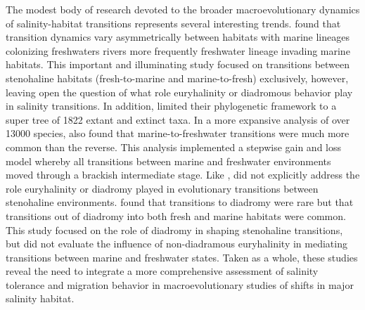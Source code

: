 \documentclass[11pt]{article}
\begin{document}
The modest body of research devoted to the broader macroevolutionary dynamics of salinity-habitat transitions represents several interesting trends. \cite{betancur2015fossil} found that transition dynamics vary asymmetrically between habitats with marine lineages colonizing freshwaters rivers more frequently freshwater lineage invading marine habitats. This important and illuminating study focused on transitions between stenohaline habitats (fresh-to-marine and marine-to-fresh) exclusively, however, leaving open the question of what role euryhalinity or diadromous behavior play in salinity transitions. In addition, \cite{betancur2015fossil} limited their phylogenetic framework to a super tree of 1822 extant and extinct taxa. In a more expansive analysis of over 13000 species, \cite{rabosky2020speciation} also found that marine-to-freshwater transitions were much more common than the reverse. This analysis implemented a stepwise gain and loss model whereby all transitions between marine and freshwater environments moved through a brackish intermediate stage. Like \cite{betancur2015fossil}, \cite{rabosky2020speciation} did not explicitly address the role euryhalinity or diadromy played in evolutionary transitions between stenohaline environments. \cite{corush2019evolutionary} found that transitions to diadromy were rare but that transitions out of diadromy into both fresh and marine habitats were common. This study focused on the role of diadromy in shaping stenohaline transitions, but did not evaluate the influence of non-diadramous euryhalinity in mediating transitions between marine and freshwater states. Taken as a whole, these studies reveal the need to integrate a more comprehensive assessment of salinity tolerance and migration behavior in macroevolutionary studies of shifts in major salinity habitat.
                                        
\end{document}
